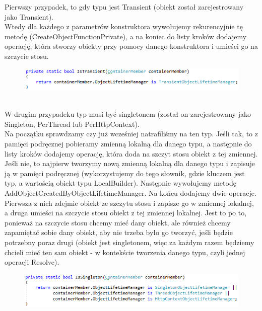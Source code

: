 \documentclass[12pt]{article}
\begin{document}
Pierwszy przypadek, to gdy typu jest Transient (obiekt został zarejestrowany jako Transient).\\
Wtedy dla każdego z parametrów konstruktora wywołujemy rekurencyjnie tę metodę (CreateObjectFunctionPrivate), a na koniec do listy kroków dodajemy operację, która stworzy obiekty przy pomocy danego konstruktora i umieści go na szczycie stosu.
\begin{figure}[h]
	\begin{raggedleft}
  		\includegraphics{FullEmitFunction_IsTransient.png}
	\end{raggedleft}
\end{figure}\\
W drugim przypadeku typ musi być singletonem (został on zarejestrowany jako Singleton, PerThread lub PerHttpContext).\\
Na początku sprawdzamy czy już wcześniej natrafiliśmy na ten typ. Jeśli tak, to z pamięci podręcznej pobieramy zmienną lokalną dla danego typu, a następnie do listy kroków dodajemy operację, która doda na szczyt stosu obiekt z tej zmiennej. Jeśli nie, to najpierw tworzymy nową zmienną lokalną dla danego typu i zapisuje ją w pamięci podręcznej (wykorzystujemy do tego słownik, gdzie kluczem jest typ, a wartością obiekt typu LocalBuilder). Następnie wywołujemy metodę AddObjectCreatedByObjectLifetimeManager. Na końcu dodajemy dwie operacje. Pierwsza z nich zdejmie obiekt ze szczytu stosu i zapisze go w zmiennej lokalnej, a druga umieści na szczycie stosu obiekt z tej zmiennej lokalnej. Jest to po to, ponieważ na szczycie stosu chcemy mieć dany obiekt, ale również chcemy zapamiętać sobie dany obiekt, aby nie trzeba było go tworzyć, jeśli będzie potrzebny poraz drugi (obiekt jest singletonem, więc za każdym razem będziemy chcieli mieć ten sam obiekt - w kontekście tworzenia danego typu, czyli jednej operacji Resolve).
\begin{figure}[h]
	\begin{raggedleft}
  		\includegraphics{FullEmitFunction_IsSingleton.png}
	\end{raggedleft}
\end{figure}\\
\end{document}
